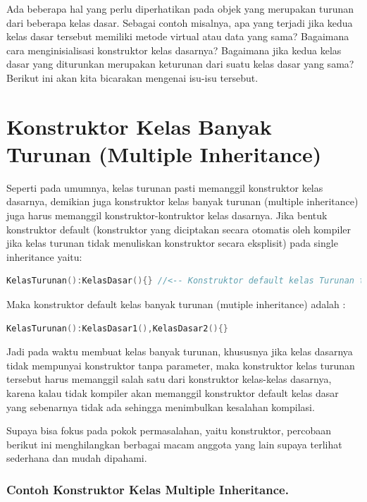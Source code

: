 Ada beberapa hal yang perlu diperhatikan pada objek yang merupakan
turunan dari beberapa kelas dasar. Sebagai contoh misalnya, apa yang
terjadi jika kedua kelas dasar tersebut memiliki metode virtual atau
data yang sama? Bagaimana cara menginisialisasi konstruktor kelas
dasarnya? Bagaimana jika kedua kelas dasar yang diturunkan merupakan
keturunan dari suatu kelas dasar yang sama? Berikut ini akan kita
bicarakan mengenai isu-isu tersebut.

\section{Konstruktor Kelas Banyak Turunan (Multiple Inheritance)}\label{konstruktor-kelas-banyak-turunan-multiple-inheritance}

Seperti pada umumnya, kelas turunan pasti memanggil konstruktor kelas
dasarnya, demikian juga konstruktor kelas banyak turunan (multiple
inheritance) juga harus memanggil konstruktor-kontruktor kelas dasarnya.
Jika bentuk konstruktor default (konstruktor yang diciptakan secara
otomatis oleh kompiler jika kelas turunan tidak menuliskan konstruktor
secara eksplisit) pada single inheritance yaitu:

\begin{lstlisting}[language=c++, numbers=none]
KelasTurunan():KelasDasar(){} //<-- Konstruktor default kelas Turunan tunggal
\end{lstlisting}

Maka konstruktor default kelas banyak turunan (mutiple inheritance)
adalah :

\begin{lstlisting}[language=c++, numbers=none]
KelasTurunan():KelasDasar1(),KelasDasar2(){}
\end{lstlisting}

Jadi pada waktu membuat kelas banyak turunan, khususnya jika kelas
dasarnya tidak mempunyai konstruktor tanpa parameter, maka konstruktor
kelas turunan tersebut harus memanggil salah satu dari konstruktor
kelas-kelas dasarnya, karena kalau tidak kompiler akan memanggil
konstruktor default kelas dasar yang sebenarnya tidak ada sehingga
menimbulkan kesalahan kompilasi.

Supaya bisa fokus pada pokok permasalahan, yaitu konstruktor, percobaan
berikut ini menghilangkan berbagai macam anggota yang lain supaya
terlihat sederhana dan mudah dipahami.

\subsubsection*{Contoh  Konstruktor Kelas Multiple Inheritance.}

